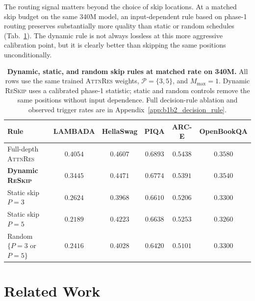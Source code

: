 \documentclass{article}
\newcommand{\attnres}{\textsc{AttnRes}}
\newcommand{\reskip}{\textsc{ReSkip}}
\begin{document}
The routing signal matters beyond the choice of skip locations. At a matched skip budget on the same 340M model, an input-dependent rule based on phase-1 routing preserves substantially more quality than static or random schedules (Tab.~\ref{tab:decision_main}). The dynamic rule is not always lossless at this more aggressive calibration point, but it is clearly better than skipping the same positions unconditionally.

\begin{table}[t]
\caption{\textbf{Dynamic, static, and random skip rules at matched rate on 340M.} All rows use the same trained \attnres{} weights, $\mathcal{P}{=}\{3,5\}$, and $M_{\max}{=}1$. Dynamic \reskip{} uses a calibrated phase-1 statistic; static and random controls remove the same positions without input dependence. Full decision-rule ablation and observed trigger rates are in Appendix~\ref{app:b1b2_decision_rule}.}
\label{tab:decision_main}
\centering\small
\setlength{\tabcolsep}{5pt}
\begin{tabular}{lccccc}
\toprule
Rule & LAMBADA & HellaSwag & PIQA & ARC-E & OpenBookQA \\
\midrule
Full-depth \attnres{} & $0.4054$ & $0.4607$ & $0.6893$ & $0.5438$ & $0.3580$ \\
\textbf{Dynamic \reskip{}} & $\mathbf{0.3445}$ & $\mathbf{0.4471}$ & $\mathbf{0.6774}$ & $\mathbf{0.5391}$ & $\mathbf{0.3540}$ \\
Static skip $P{=}3$ & $0.2624$ & $0.3968$ & $0.6610$ & $0.5206$ & $0.3300$ \\
Static skip $P{=}5$ & $0.2189$ & $0.4223$ & $0.6638$ & $0.5253$ & $0.3260$ \\
Random $\{P{=}3$ or $P{=}5\}$ & $0.2416$ & $0.4028$ & $0.6420$ & $0.5101$ & $0.3300$ \\
\bottomrule
\end{tabular}
\end{table}



\section{Related Work}
\label{sec:related}
\end{document}
